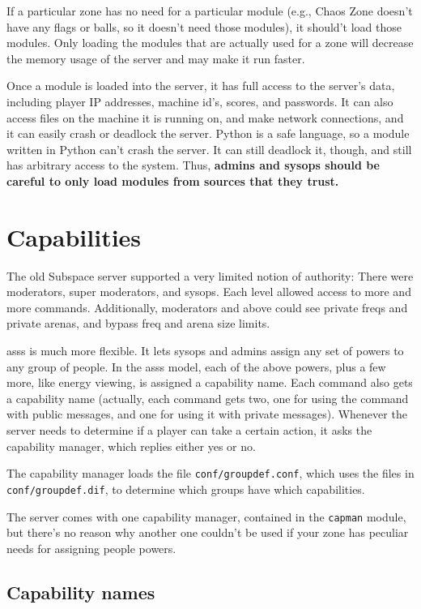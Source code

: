 \documentclass{article}
\newcommand{\asss}{asss}
\begin{document}
If a particular zone has no need for a particular module (e.g., Chaos
Zone doesn't have any flags or balls, so it doesn't need those modules),
it should't load those modules. Only loading the modules that are
actually used for a zone will decrease the memory usage of the server
and may make it run faster.

Once a module is loaded into the server, it has full access to the
server's data, including player IP addresses, machine id's, scores, and
passwords. It can also access files on the machine it is running on, and
make network connections, and it can easily crash or deadlock the
server. Python is a safe language, so a module written in Python can't
crash the server. It can still deadlock it, though, and still has
arbitrary access to the system. Thus, \textbf{admins and sysops should
be careful to only load modules from sources that they trust.}


\section{Capabilities}

The old Subspace server supported a very limited notion of authority:
There were moderators, super moderators, and sysops. Each level allowed
access to more and more commands. Additionally, moderators and above
could see private freqs and private arenas, and bypass freq and arena
size limits.

\asss{} is much more flexible. It lets sysops and admins assign any set
of powers to any group of people. In the \asss{} model, each of the
above powers, plus a few more, like energy viewing, is assigned a
capability name. Each command also gets a capability name (actually,
each command gets two, one for using the command with public messages,
and one for using it with private messages). Whenever the server needs
to determine if a player can take a certain action, it asks the
capability manager, which replies either yes or no.

The capability manager loads the file \texttt{conf/groupdef.conf}, which
uses the files in \texttt{conf/groupdef.dif}, to determine which groups
have which capabilities.

The server comes with one capability manager, contained in the
\texttt{capman} module, but there's no reason why another one couldn't
be used if your zone has peculiar needs for assigning people powers.

\subsection{Capability names}
\end{document}

